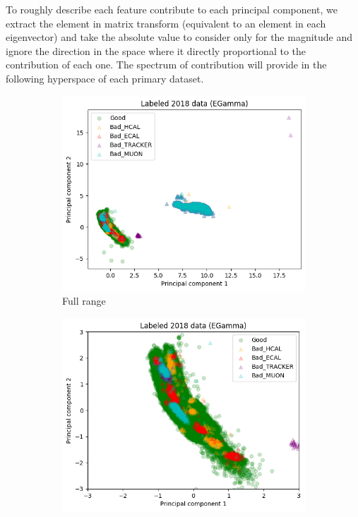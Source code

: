 To roughly describe each feature contribute to each principal component, we extract the element in matrix transform (equivalent to an element in each eigenvector) and take the absolute value to consider only for the magnitude and ignore the direction in the space where it directly proportional to the contribution of each one.
The spectrum of contribution will provide in the following hyperspace of each primary dataset.

\begin{figure}[h!]
\centering
    \begin{subfigure}[b]{0.49\linewidth}
        \includegraphics[width=\linewidth]{images/reco/2018/EGamma_subsystem_label.png}
        \caption{Full range}
    \end{subfigure}
    \begin{subfigure}[b]{0.49\linewidth}
        \includegraphics[width=\linewidth]{images/reco/2018/EGamma_subsystem_label_short_range.png}

\end{subfigure}
\end{figure}
